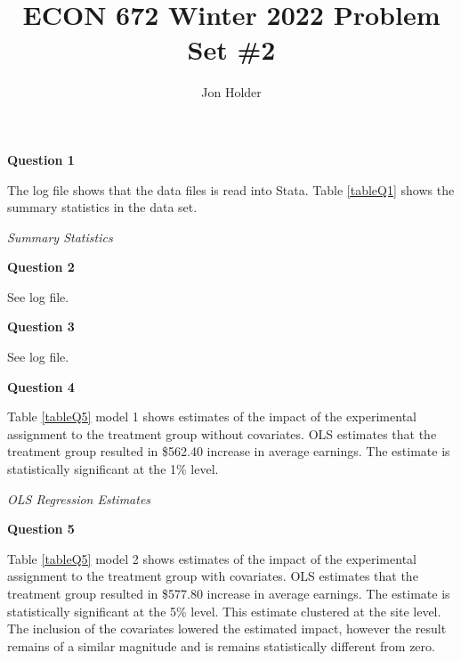 \documentclass[12pt]{article}
\begin{document}
\title{ECON 672 Winter 2022 Problem Set \#2}
\author{Jon Holder}

\newcommand{\question}[1]{\textbf{\noindent Question #1}}
\newcommand{\tabindent}{\hspace{3mm}}

\newcommand{\todo}{\color{red}{\textbf{TODO}}}

\maketitle
\question{1}
    \begin{list}{}{}
        \item The log file shows that the data files is read into Stata. 
        Table \ref{tableQ1} shows the summary statistics in the data set.
        \begin{table}[h!]
            \centering
            \caption{\textit{Summary Statistics}} 
            \label{tableQ1}
        \end{table}
    \end{list}

\question{2}
    \begin{list}{}{}
        \item See log file.
    \end{list}

\question{3}
    \begin{list}{}{}
        \item See log file.
    \end{list}

\question{4}
    \begin{list}{}{}
        \item Table \ref{tableQ5} model 1 shows estimates of the impact of the 
        experimental assignment to the treatment group without covariates. OLS 
        estimates that the treatment group resulted in \$562.40 increase in 
        average earnings. The estimate is statistically significant at the 1\% 
        level. 
    \end{list}
    \begin{table}[h!]
        \centering
        \caption{\textit{OLS Regression Estimates} }
        \label{tableQ5}
    \end{table}

\question{5}
    \begin{list}{}{}
        \item Table \ref{tableQ5} model 2 shows estimates of the impact of the 
        experimental assignment to the treatment group with covariates. OLS 
        estimates that the treatment group resulted in \$577.80 increase in 
        average earnings. The estimate is statistically significant at the 5\% 
        level. This estimate clustered at the site level. The inclusion of the 
        covariates lowered the estimated impact, however the result remains 
        of a similar magnitude and is remains statistically different from zero.
    \end{list}
\end{document}
